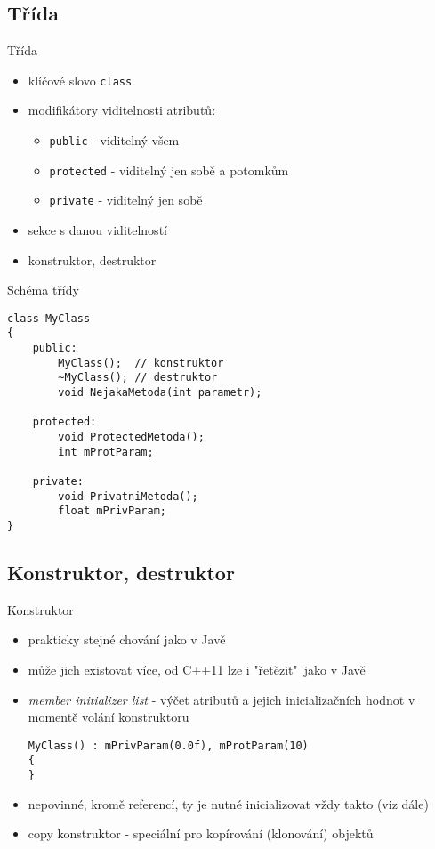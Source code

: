 \documentclass{beamer}
\begin{document}
\subsection{Třída}

\begin{xframe}{Třída}
	\begin{itemize}
		\item klíčové slovo \texttt{class}
		\item modifikátory viditelnosti atributů:
			\begin{itemize}
				\item \texttt{public} - viditelný všem
				\item \texttt{protected} - viditelný jen sobě a potomkům
				\item \texttt{private} - viditelný jen sobě
			\end{itemize}
		\item sekce s danou viditelností
		\item konstruktor, destruktor
	\end{itemize}
\end{xframe}

\begin{xframe}{Schéma třídy}
\begin{lstlisting}[basicstyle=\ttfamily\small]
class MyClass
{
    public:
        MyClass();  // konstruktor
        ~MyClass(); // destruktor
        void NejakaMetoda(int parametr);

    protected:
        void ProtectedMetoda();
        int mProtParam;

    private:
        void PrivatniMetoda();
        float mPrivParam;
}
\end{lstlisting}
\end{xframe}

\subsection{Konstruktor, destruktor}

\begin{xframe}{Konstruktor}
	\begin{itemize}
		\item prakticky stejné chování jako v Javě
		\item může jich existovat více, od C++11 lze i "řetězit"~jako v Javě
		\item \emph{member initializer list} - výčet atributů a jejich inicializačních hodnot v momentě volání konstruktoru
\begin{lstlisting}[basicstyle=\ttfamily\small]
MyClass() : mPrivParam(0.0f), mProtParam(10)
{
}
\end{lstlisting}
		\item nepovinné, kromě referencí, ty je nutné inicializovat vždy takto (viz dále)
		\item copy konstruktor - speciální pro kopírování (klonování) objektů
	\end{itemize}
\end{xframe}
\end{document}
